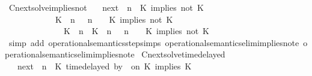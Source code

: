 \begin{isabellebody}
\endisatagproof
{\isafoldproof}%
%
\isadelimproof
\isanewline
%
\endisadelimproof
\isanewline
{}\isamarkupfalse%
\ Cnext{\isacharunderscore}solve{\isacharunderscore}implies{\isacharunderscore}not{\isacharcolon}\isanewline
\ \ \ {\isachardoublequoteopen}{\isacharparenleft}{\isasymC}\isactrlsub n\isactrlsub e\isactrlsub x\isactrlsub t\ {\isacharparenleft}{\isasymGamma}{\isacharcomma}\ n\ {\isasymturnstile}\ {\isacharparenleft}{\isacharparenleft}K\ implies\ not\ K\ {\isacharhash}\ {\isasymPsi}{\isacharparenright}\ {\isasymtriangleright}\ {\isasymPhi}{\isacharparenright}{\isacharparenright}\isanewline
\ \ \ \ \ \ \ \ \ \ {\isasymsupseteq}\ {\isacharbraceleft}\ {\isacharparenleft}{\isacharparenleft}K\ {\isasymnot}{\isasymUp}\ n{\isacharparenright}\ {\isacharhash}\ {\isasymGamma}{\isacharparenright}{\isacharcomma}\ n\ {\isasymturnstile}\ {\isasymPsi}\ {\isasymtriangleright}\ {\isacharparenleft}{\isacharparenleft}K\ implies\ not\ K\ {\isacharhash}\ {\isasymPhi}{\isacharparenright}{\isacharcomma}\isanewline
\ \ \ \ \ \ \ \ \ \ \ \ \ \ {\isacharparenleft}{\isacharparenleft}K\ {\isasymUp}\ n{\isacharparenright}\ {\isacharhash}\ {\isacharparenleft}K\ {\isasymnot}{\isasymUp}\ n{\isacharparenright}\ {\isacharhash}\ {\isasymGamma}{\isacharparenright}{\isacharcomma}\ n\ {\isasymturnstile}\ {\isasymPsi}\ {\isasymtriangleright}\ {\isacharparenleft}{\isacharparenleft}K\ implies\ not\ K\ {\isacharhash}\ {\isasymPhi}{\isacharparenright}{\isacharbraceright}{\isachardoublequoteclose}\isanewline
%
\isadelimproof
\ \ %
\endisadelimproof
%
\isatagproof
{}\isamarkupfalse%
\ {\isacharparenleft}simp\ add{\isacharcolon}\ operational{\isacharunderscore}semantics{\isacharunderscore}step{\isachardot}simps\ operational{\isacharunderscore}semantics{\isacharunderscore}elim{\isachardot}implies{\isacharunderscore}not{\isacharunderscore}e{}\ operational{\isacharunderscore}semantics{\isacharunderscore}elim{\isachardot}implies{\isacharunderscore}not{\isacharunderscore}e{}{\isacharparenright}%
\endisatagproof
{\isafoldproof}%
%
\isadelimproof
\isanewline
%
\endisadelimproof
\isanewline
{}\isamarkupfalse%
\ Cnext{\isacharunderscore}solve{\isacharunderscore}timedelayed{\isacharcolon}\isanewline
\ \ \ {\isachardoublequoteopen}{\isacharparenleft}{\isasymC}\isactrlsub n\isactrlsub e\isactrlsub x\isactrlsub t\ {\isacharparenleft}{\isasymGamma}{\isacharcomma}\ n\ {\isasymturnstile}\ {\isacharparenleft}{\isacharparenleft}K\ time{\isacharminus}delayed\ by\ {\isasymdelta}{\isasymtau}\ on\ K\ implies\ K\ {\isacharhash}\ {\isasymPsi}{\isacharparenright}\ {\isasymtriangleright}\ {\isasymPhi}{\isacharparenright}{\isacharparenright}\isanewline

\end{isabellebody}
